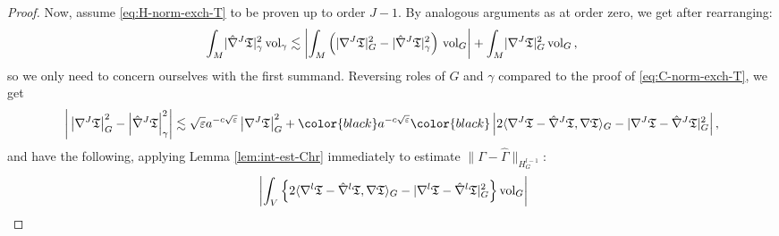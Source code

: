 \documentclass[11pt,leqno,textwidth=10cm]{amsart}
\numberwithin{equation}{section}
\theoremstyle{definition}
\theoremstyle{plain}
\newcommand{\1}{\mathbbm{1}}
\newcommand{\vol}[1]{{\text{\normalfont{vol}}}_{#1}}
\renewcommand{\epsilon}{\varepsilon}
\newcommand{\Gamhat}{\hat{\Gamma}}
\newcommand{\nabhat}{\hat{\nabla}}
\newcommand{\change}[1]{\color{black}#1\color{black}}
\begin{document}
\begin{proof}

Now, assume \eqref{eq:H-norm-exch-T} to be proven up to order $J-1$. By analogous arguments as at order zero, we get \change{after rearranging}:
\change{\[\int_M\lvert\nabhat^J\mathfrak{T}\rvert_\gamma^2\,\vol{\gamma}\lesssim \left\lvert\int_M\left(\lvert\nabla^J\mathfrak{T}\rvert_G^2-\lvert\nabhat^J\mathfrak{T}\rvert_{\gamma}^2\right)\,\vol{G}\right\rvert+\int_M\lvert\nabla^J\mathfrak{T}\rvert_G^2\,\vol{G}\,,\]}
so we only need to concern ourselves with the first summand. Reversing roles of $G$ and $\gamma$ compared to the proof of \eqref{eq:C-norm-exch-T}, we get
\begin{equation*}
\left\lvert\,\left\lvert\nabla^J\mathfrak{T}\right\rvert_G^2-\left\lvert\nabhat^J\mathfrak{T}\right\rvert_\gamma^2\right\rvert\lesssim\sqrt{\epsilon}a^{-c\sqrt{\epsilon}}\left\lvert\nabla^J\mathfrak{T}\right\rvert_G^2+\change{a^{-c\sqrt{\epsilon}}}\left\lvert 2\langle\nabla^J\mathfrak{T}-\nabhat^J\mathfrak{T},\nabla\mathfrak{T}\rangle_G-\lvert\nabla^J\mathfrak{T}-\nabhat^J\mathfrak{T}\rvert_G^2\right\rvert
,
\end{equation*}
and have the following, applying Lemma \ref{lem:int-est-Chr} immediately to estimate $\|\Gamma-\Gamhat\|_{H^{l-1}_G}$:
\begin{align*}
&\,\left\rvert\int_V\left\{2\langle\nabla^l\mathfrak{T}-\nabhat^l\mathfrak{T},\nabla\mathfrak{T}\rangle_G-\lvert\nabla^l\mathfrak{T}-\nabhat^l\mathfrak{T}\rvert_G^2\right\}\vol{G}\right\rvert\\

\end{align*}
\end{proof}
\end{document}
